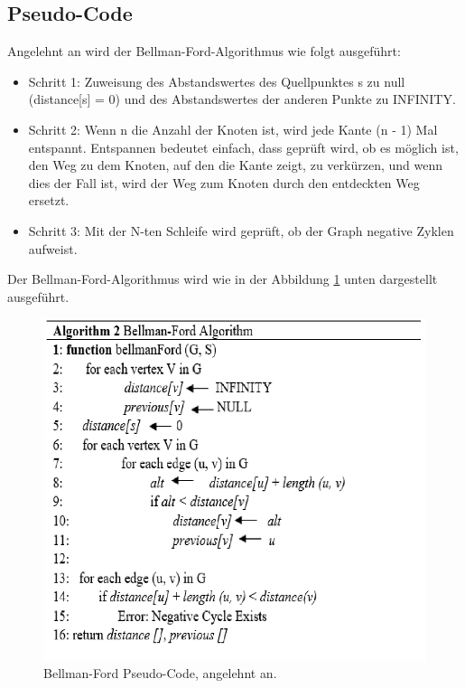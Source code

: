 \subsection{Pseudo-Code}

Angelehnt an \cite{Abusalim2020} wird der Bellman-Ford-Algorithmus wie folgt ausgeführt:
\newline
\begin{itemize}
	\item   Schritt 1: Zuweisung des Abstandswertes des Quellpunktes s zu null (distance[s] = 0) und des Abstandswertes der anderen Punkte zu INFINITY.
	\item Schritt 2: Wenn n die Anzahl der Knoten ist, wird jede Kante (n - 1) Mal entspannt. Entspannen bedeutet einfach, dass geprüft wird, ob es möglich ist, den Weg zu dem Knoten, auf den die Kante zeigt, zu verkürzen, und wenn dies der Fall ist, wird der Weg zum Knoten durch den entdeckten Weg ersetzt.
	\item Schritt 3: Mit der N-ten Schleife wird geprüft, ob der Graph negative Zyklen aufweist.
\end{itemize}
Der Bellman-Ford-Algorithmus wird wie in der Abbildung \ref{fig:Bellman-Ford Pseudo-code} unten dargestellt ausgeführt.
\begin{figure}[H]
	\centering
	\includegraphics[width=1.0\textwidth]{images/Bellman-Ford-Algorithmus_Pseudo-Code.PNG}
	\caption{Bellman-Ford Pseudo-Code, angelehnt an\cite{Abusalim2020}.}
	\label{fig:Bellman-Ford Pseudo-code}
\end{figure}







